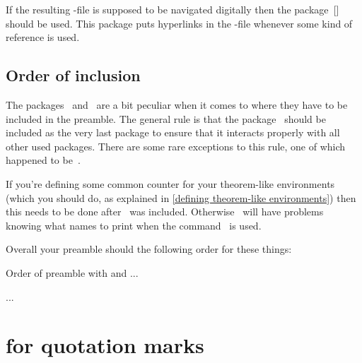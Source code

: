 If the resulting -file is supposed to be navigated digitally then the package~[\packname] should be used.
This package puts hyperlinks in the -file whenever some kind of reference is used.



\subsection{Order of inclusion}

The packages~ and~ are a bit peculiar when it comes to where they have to be included in the preamble.
The general rule is that the package~ should be included as the very last package to ensure that it interacts properly with all other used packages.
There are some rare exceptions to this rule, one of which happened to be~.

If you’re defining some common counter for your theorem-like environments (which you should do, as explained in \cref{defining theorem-like environments}) then this needs to be done after~ was included.
Otherwise~ will have problems knowing what names to print when the command~ is used.

Overall your preamble should the following order for these things:
\begin{showcode}{Order of preamble with  and }
...
\usepackage{amsthm}
...

\usepackage{hyperref}
\usepackage{cleveref}

\newtheorem{theorem}[everything]{Theorem}
\end{showcode}





\section{ for quotation marks}

